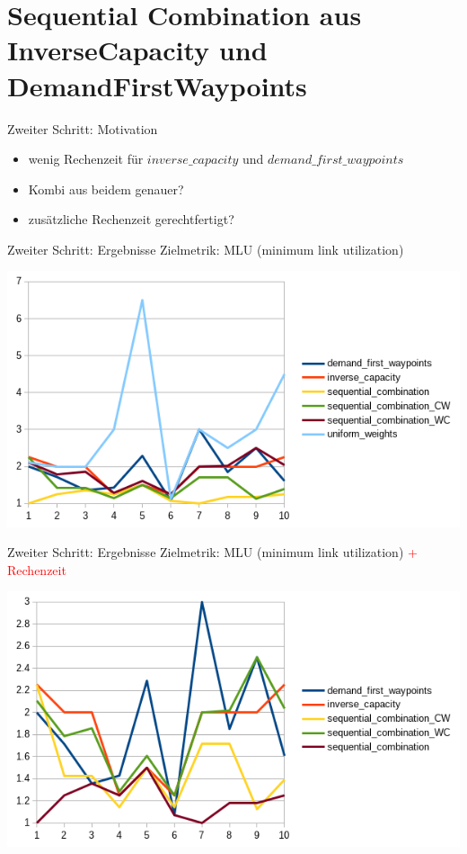 \documentclass[aspectratio=169,10pt]{beamer}
\begin{document}
\section{Sequential Combination aus InverseCapacity und DemandFirstWaypoints}
\begin{frame}{Zweiter Schritt: Motivation}
\Large
\begin{itemize}
    \item wenig Rechenzeit f\"ur $inverse\_capacity$ und $demand\_first\_waypoints$
    \item Kombi aus beidem genauer?
    \item zus\"atzliche Rechenzeit gerechtfertigt?
\end{itemize}
\end{frame}
\begin{frame}{Zweiter Schritt: Ergebnisse}
\Large
Zielmetrik: MLU (minimum link utilization)
\begin{center}
\includegraphics[width=.8\textwidth]{images/pouria1.png}
\end{center}
\end{frame}
\begin{frame}{Zweiter Schritt: Ergebnisse}
\Large
Zielmetrik: MLU (minimum link utilization) \textcolor{red}{+ Rechenzeit}
\begin{center}
\includegraphics[width=.8\textwidth]{images/pouria2.png}
\end{center}
\end{frame}
\end{document}
